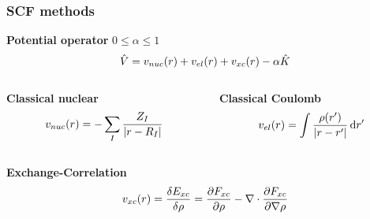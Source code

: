 %
%

\begin{frame}
  \frametitle{SCF methods}
  \centering
  \textbf{Potential operator} $0 \leq \alpha \leq 1$
  \begin{equation}
    \nonumber
    \hat{V} = v_{nuc}(r) + v_{el}(r) + v_{xc}(r) - \alpha\hat{K}
  \end{equation}

  \vspace{10mm}

  \begin{columns}
    \begin{column}[b]{0.5\textwidth}
      \centering
      \textbf{Classical nuclear}
      \begin{equation}
        \nonumber
	    v_{nuc}(r) = -\sum_I\frac{Z_I}{|r-R_I|}
      \end{equation}
    \end{column}

    \begin{column}[b]{0.5\textwidth}
      \centering
      \textbf{Classical Coulomb}
      \begin{equation}
        \nonumber
        v_{el}(r) = \int \frac{\rho(r')}{|r-r'|} \,\mathrm{d} r'
      \end{equation}
    \end{column}
  \end{columns}

  \vspace{5mm}

  \begin{columns}
    \begin{column}[b]{0.5\textwidth}
      \centering
      \textbf{Exchange-Correlation}
      \begin{equation}
        \nonumber
        v_{xc}(r)
        = \frac{\delta E_{xc}}{\delta \rho}
        = \frac{\partial F_{xc}}{\partial \rho} - \nabla \cdot \frac{\partial F_{xc}}{\partial \nabla\rho}
      \end{equation}
    \end{column}


\end{columns}
\end{frame}
